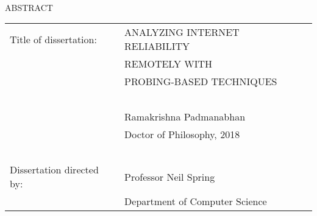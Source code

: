 
\hbox{\ }

\renewcommand{\baselinestretch}{1}
\small \normalsize

\begin{center}
\large{{ABSTRACT}}

\vspace{3em}

\end{center}
\hspace{-.15in}
\begin{tabular}{ll}

Title of dissertation:    & {\large  ANALYZING INTERNET RELIABILITY}\\
&                     {\large  REMOTELY WITH} \\
&                     {\large  PROBING-BASED TECHNIQUES} \\
\ \\
&                          {\large  Ramakrishna Padmanabhan} \\
&                           {\large Doctor of Philosophy, 2018} \\
\ \\
Dissertation directed by: & {\large  Professor Neil Spring} \\
&               {\large  Department of Computer Science } \\
\end{tabular}

\vspace{3em}

\renewcommand{\baselinestretch}{2}
\large \normalsize




